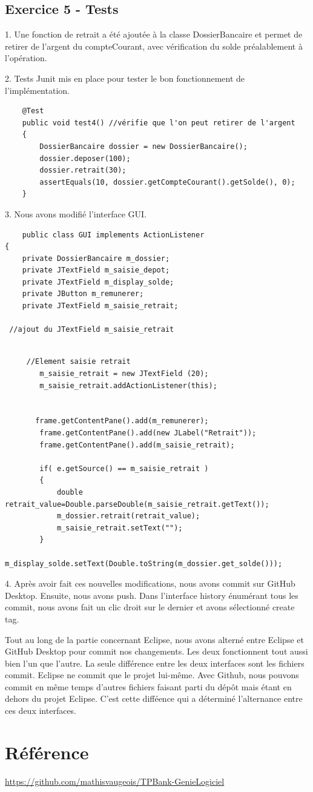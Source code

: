 \documentclass{article}
\begin{document}
\newpage
\subsection{Exercice 5 - Tests}
1.
Une fonction de retrait a été ajoutée à la classe DossierBancaire et permet de retirer de l'argent du compteCourant, avec vérification du 
solde préalablement à l'opération.

2.
Tests Junit mis en place pour tester le bon fonctionnement de l'implémentation.
\begin{lstlisting}
    @Test  
	public void test4() //vérifie que l'on peut retirer de l'argent
	{
		DossierBancaire dossier = new DossierBancaire();
		dossier.deposer(100);
		dossier.retrait(30);
		assertEquals(10, dossier.getCompteCourant().getSolde(), 0);
	}
\end{lstlisting}

3.
Nous avons modifié l'interface GUI.

\begin{lstlisting}
    public class GUI implements ActionListener 
{
	private DossierBancaire m_dossier;
	private JTextField m_saisie_depot;
	private JTextField m_display_solde;
	private JButton m_remunerer;
	private JTextField m_saisie_retrait;

 //ajout du JTextField m_saisie_retrait
	
\end{lstlisting}
\begin{lstlisting}
     //Element saisie retrait
        m_saisie_retrait = new JTextField (20);
        m_saisie_retrait.addActionListener(this);


       frame.getContentPane().add(m_remunerer); 
        frame.getContentPane().add(new JLabel("Retrait"));
        frame.getContentPane().add(m_saisie_retrait);

        if( e.getSource() == m_saisie_retrait )
    	{
    		double retrait_value=Double.parseDouble(m_saisie_retrait.getText());
    		m_dossier.retrait(retrait_value);
    		m_saisie_retrait.setText("");
    	}
    	m_display_solde.setText(Double.toString(m_dossier.get_solde())); 
\end{lstlisting}

4. Après avoir fait ces nouvelles modifications, nous avons commit sur GitHub Desktop. Ensuite, nous avons push. Dans l'interface history énumérant tous les commit, nous avons fait un clic droit sur le dernier et avons sélectionné create tag.

Tout au long de la partie concernant Eclipse, nous avons alterné entre Eclipse et GitHub Desktop pour commit nos changements. Les deux fonctionnent tout aussi bien l'un que l'autre. La seule différence entre les deux interfaces sont les fichiers commit. Eclipse ne commit que le projet lui-même. Avec Github, nous pouvons commit en même temps d'autres fichiers faisant parti du dépôt mais étant en dehors du projet Eclipse. C'est cette difféence qui a déterminé l'alternance entre ces deux interfaces.
\section*{Référence}
\url{https://github.com/mathisvaugeois/TPBank-GenieLogiciel}
\end{document}
